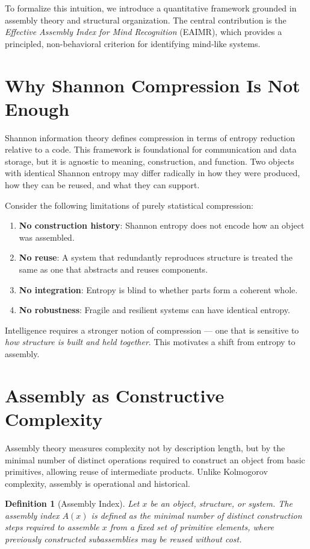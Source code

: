 \documentclass[11pt,letterpaper]{article}
\newtheorem{definition}{Definition}
\begin{document}
To formalize this intuition, we introduce a quantitative framework grounded in assembly theory and structural organization. The central contribution is the \emph{Effective Assembly Index for Mind Recognition} (EAIMR), which provides a principled, non-behavioral criterion for identifying mind-like systems.

\section{Why Shannon Compression Is Not Enough}

Shannon information theory defines compression in terms of entropy reduction relative to a code. This framework is foundational for communication and data storage, but it is agnostic to meaning, construction, and function. Two objects with identical Shannon entropy may differ radically in how they were produced, how they can be reused, and what they can support.

Consider the following limitations of purely statistical compression:
\begin{enumerate}
  \item \textbf{No construction history}: Shannon entropy does not encode how an object was assembled.
  \item \textbf{No reuse}: A system that redundantly reproduces structure is treated the same as one that abstracts and reuses components.
  \item \textbf{No integration}: Entropy is blind to whether parts form a coherent whole.
  \item \textbf{No robustness}: Fragile and resilient systems can have identical entropy.
\end{enumerate}

Intelligence requires a stronger notion of compression — one that is sensitive to \emph{how structure is built and held together}. This motivates a shift from entropy to assembly.

\section{Assembly as Constructive Complexity}

Assembly theory measures complexity not by description length, but by the minimal number of distinct operations required to construct an object from basic primitives, allowing reuse of intermediate products. Unlike Kolmogorov complexity, assembly is operational and historical.

\begin{definition}[Assembly Index]
Let $x$ be an object, structure, or system. The assembly index $A(x)$ is defined as the minimal number of distinct construction steps required to assemble $x$ from a fixed set of primitive elements, where previously constructed subassemblies may be reused without cost.
\end{definition}
\end{document}
